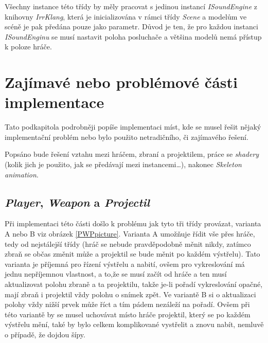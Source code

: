  Všechny instance této třídy by měly pracovat s jedinou instancí \emph{ISoundEngine} z knihovny \emph{IrrKlang}, která je inicializována v rámci třídy \emph{Scene} a modelům ve scéně je pak předána pouze jako parametr. Důvod je ten, že pro každou instanci \emph{ISoundEnginu} se musí nastavit poloha posluchače a většina modelů nemá přístup k poloze hráče. 
\section{Zajímavé nebo problémové části implementace}
Tato podkapitola podrobněji popíše implementaci míst, kde se musel řešit nějaký implementační problém nebo bylo použito netradičního, či zajímavého řešení.

Popsáno bude řešení vztahu mezi hráčem, zbraní a projektilem,  práce se \emph{shadery} (kolik jich je použito, jak se předávají mezi instancemi\dots), nakonec \emph{Skeleton animation}. 
\subsection{\emph{Player}, \emph{Weapon} a \emph{Projectil}}\label{PWP}
Při implementaci této části došlo k problému jak tyto tři třídy provázat, varianta A nebo B viz obrázek \ref{PWPpicture}. Varianta A umožňuje řídit vše přes hráče, tedy od nejstálejší třídy (hráč se nebude pravděpodobně měnit nikdy, zatímco zbraň se občas změnit může a projektil se bude měnit po každém výstřelu). Tato varianta je příjemná pro řízení výstřelu a nabití, ovšem pro vykreslování má jednu nepříjemnou vlastnost, a to,že se musí začít od hráče a ten musí aktualizovat polohu zbraně a ta projektilu, takže je-li pořadí vykreslování opačné, mají zbraň i projektil vždy polohu o snímek zpět. Ve variantě B si o aktualizaci polohy vždy nižší prvek může říct a tím pádem nezáleží na pořadí. Ovšem při této variantě by se musel uchovávat místo hráče projektil, který se po každém výstřelu mění, také by bylo celkem komplikované vystřelit a znovu nabít, nemluvě o případě, že dojdou šípy.

